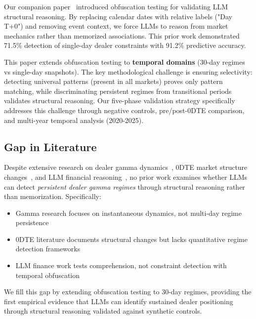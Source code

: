 Our companion paper~\citep{regan2025obfuscation} introduced obfuscation testing for validating LLM structural reasoning. By replacing calendar dates with relative labels ("Day T+0") and removing event context, we force LLMs to reason from market mechanics rather than memorized associations. This prior work demonstrated 71.5\% detection of single-day dealer constraints with 91.2\% predictive accuracy.

This paper extends obfuscation testing to \textbf{temporal domains} (30-day regimes vs single-day snapshots). The key methodological challenge is ensuring selectivity: detecting universal patterns (present in all markets) proves only pattern matching, while discriminating persistent regimes from transitional periods validates structural reasoning. Our five-phase validation strategy specifically addresses this challenge through negative controls, pre/post-0DTE comparison, and multi-year temporal analysis (2020-2025).

\subsection{Gap in Literature}

Despite extensive research on dealer gamma dynamics~\citep{ni2005stock,baltussen2021hedging}, 0DTE market structure changes~\citep{dim2025zero}, and LLM financial reasoning~\citep{lopez2023can,kim2024financial}, no prior work examines whether LLMs can detect \textit{persistent dealer gamma regimes} through structural reasoning rather than memorization. Specifically:

\begin{itemize}
\item Gamma research focuses on instantaneous dynamics, not multi-day regime persistence
\item 0DTE literature documents structural changes but lacks quantitative regime detection frameworks
\item LLM finance work tests comprehension, not constraint detection with temporal obfuscation
\end{itemize}

We fill this gap by extending obfuscation testing to 30-day regimes, providing the first empirical evidence that LLMs can identify sustained dealer positioning through structural reasoning validated against synthetic controls.
